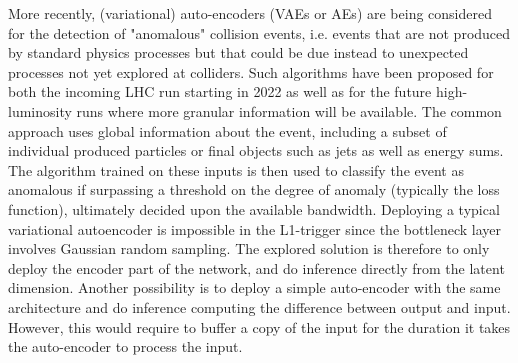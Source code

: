 
More recently, (variational) auto-encoders (VAEs or AEs) are being considered for the detection of "anomalous" collision events, i.e. events that are not produced by standard physics processes but that could be due instead to unexpected processes not yet explored at colliders. 
Such algorithms have been proposed for both the incoming LHC run starting in 2022 as well as for the future high-luminosity runs where more granular information will be available. 
The common approach uses global information about the event, including a subset of individual produced particles or final objects such as jets as well as energy sums. 
The algorithm trained on these inputs is then used to classify the event as anomalous if surpassing a threshold on the degree of anomaly (typically the loss function), ultimately decided upon the available bandwidth.
Deploying a typical variational autoencoder is impossible in the L1-trigger since the bottleneck layer involves Gaussian random sampling. The explored solution is therefore to only deploy the encoder part of the network, and do inference directly from the latent dimension. Another possibility is to deploy a simple auto-encoder with the same architecture and do inference computing the difference between output and input. However, this would require to buffer a copy of the input for the duration it takes the auto-encoder to process the input.
